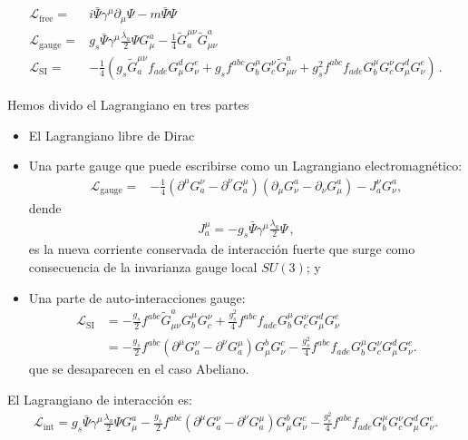 \begin{align}
\label{eq:qcdgauge}
\mathcal{L}_{\text{free}}=&i\bar{\Psi}\gamma^\mu\partial_\mu\Psi-m\bar{\Psi}\Psi\nonumber\\
  \mathcal{L}_{\text{gauge}}=&g_s\bar{\Psi}\gamma^\mu\frac{\lambda_a}{2}\Psi G_\mu^a
  - \frac{1}{4}\widetilde{G}^{\mu\nu}_a \widetilde{G}_{\mu\nu}^a\nonumber\\
  \mathcal{L}_{\text{SI}}=&- \frac{1}{4}\left(g_s\widetilde{G}^{\mu\nu}_af_{a d e}G^d_\mu G^e_\nu
    +g_sf^{a b c}G_b^\mu G_c^\nu\widetilde{G}_{\mu\nu}^a
    +g_s^2f^{a b c}f_{a d e}G_b^\mu G_c^\nu G^d_\mu G^e_\nu\right)\,.
\end{align}

Hemos divido el Lagrangiano en tres partes
\begin{itemize}
\item El Lagrangiano libre de Dirac
\item Una parte gauge que puede escribirse como un Lagrangiano electromagnético:
\begin{align}
  \mathcal{L}_{\text{gauge}}=&-\frac{1}{4}\left(\partial^\mu G^\nu_a-\partial^\nu G^\mu_a\right)\left(\partial_\mu G_\nu^a-\partial_\nu G_\mu^a\right)-J^\nu_aG_\nu^a,
\end{align}
dende
\begin{align}
  J^\mu_a=-g_s\bar{\Psi}\gamma^\mu\frac{\lambda_a}{2}\Psi\,,
\end{align}
es la nueva corriente conservada de interacción fuerte que surge como consecuencia de la invarianza gauge local $SU(3)$; y 
\item Una parte de auto-interacciones gauge:
  \begin{align}
    \mathcal{L}_{\text{SI}}  &=- \frac{g_s}{2}f^{a b c}\widetilde{G}_{\mu\nu}^aG_b^\mu G_c^\nu
    +\frac{g_s^2}{4}f^{a b c}f_{a d e}G_b^\mu G_c^\nu G^d_\mu G^e_\nu\nonumber\\
  &=-\frac{g_s}{2}f^{abc}\left(\partial^\mu G^\nu_a-\partial^\nu G^\mu_a\right)G^b_\mu G^c_\nu-\frac{g_s^2}{4}f^{abc}f_{ade}G^\mu_bG^\nu_cG^d_\mu G^e_\nu.
  \end{align}
que se desaparecen en el caso Abeliano.
\end{itemize}

El Lagrangiano de interacción es:
\begin{align}
  \mathcal{L}_{\text{int}}=g_s\bar{\Psi}\gamma^\mu\frac{\lambda_a}{2}\Psi G_\mu^a-\frac{g_s}{2}f^{abc}\left(\partial^\mu G^\nu_a-\partial^\nu G^\mu_a\right)G^b_\mu G^c_\nu-\frac{g_s^2}{4}f^{abc}f_{ade}G^\mu_bG^\nu_cG^d_\mu G^e_\nu.
\end{align}

